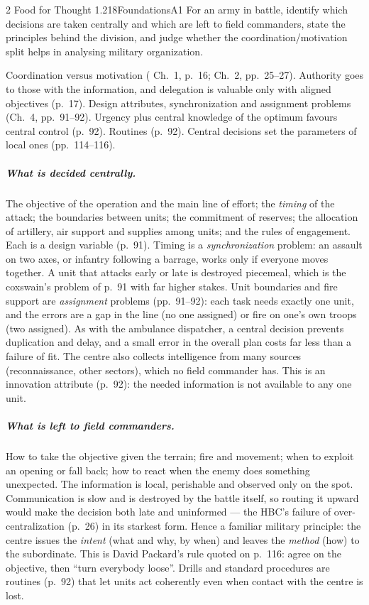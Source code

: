 \begin{exsol}{2}{\MR{} Food for Thought 1.2}{18}{Foundations}{A1}
\asked For an army in battle, identify which decisions are taken centrally and which are left to
field commanders, state the principles behind the division, and judge whether the
coordination/motivation split helps in analysing military organization.

\method Coordination versus motivation (\MR{} Ch.~1, p.~16; Ch.~2, pp.~25--27). Authority goes to
those with the information, and delegation is valuable only with aligned objectives (p.~17). Design
attributes, synchronization and assignment problems (Ch.~4, pp.~91--92). Urgency plus central
knowledge of the optimum favours central control (p.~92). Routines (p.~92). Central decisions set
the parameters of local ones (pp.~114--116).

\solution
\subparagraph{What is decided centrally.} The objective of the operation and the main line of
effort; the \emph{timing} of the attack; the boundaries between units; the commitment of reserves;
the allocation of artillery, air support and supplies among units; and the rules of engagement.
Each is a design variable (p.~91). Timing is a \emph{synchronization} problem: an assault on two
axes, or infantry following a barrage, works only if everyone moves together. A unit that attacks
early or late is destroyed piecemeal, which is the coxswain's problem of p.~91 with far higher
stakes. Unit boundaries and fire support are \emph{assignment} problems (pp.~91--92): each task
needs exactly one unit, and the errors are a gap in the line (no one assigned) or fire on one's
own troops (two assigned). As with the ambulance dispatcher, a central decision prevents
duplication and delay, and a small error in the overall plan costs far less than a failure of fit.
The centre also collects intelligence from many sources (reconnaissance, other sectors), which no
field commander has. This is an innovation attribute (p.~92): the needed information is not
available to any one unit.

\subparagraph{What is left to field commanders.} How to take the objective given the terrain;
fire and movement; when to exploit an opening or fall back; how to react when the enemy does
something unexpected. The information is local, perishable and observed only on the spot.
Communication is slow and is destroyed by the battle itself, so routing it upward would make the
decision both late and uninformed --- the HBC's failure of over-centralization (p.~26) in its
starkest form. Hence a familiar military principle: the centre issues the \emph{intent} (what and
why, by when) and leaves the \emph{method} (how) to the subordinate. This is David Packard's rule
quoted on p.~116: agree on the objective, then ``turn everybody loose''. Drills and standard
procedures are routines (p.~92) that let units act coherently even when contact with the centre
is lost.


\end{exsol}
